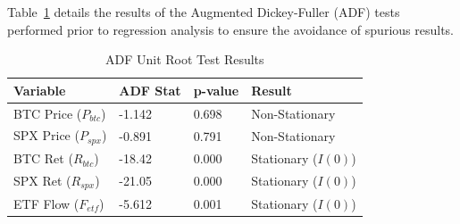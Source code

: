 \documentclass[10pt, conference, compsocconf]{IEEEtran}
\begin{document}
Table~\ref{tab:stationarity} details the results of the Augmented Dickey-Fuller (ADF) tests performed prior to regression analysis to ensure the avoidance of spurious results.

\begin{table}[htbp]
\caption{ADF Unit Root Test Results}
\centering
\small
\begin{tabularx}{\linewidth}{lXXX}
\toprule
\textbf{Variable} & \textbf{ADF Stat} & \textbf{p-value} & \textbf{Result} \\
\midrule
BTC Price ($P_{btc}$) & -1.142 & 0.698 & Non-Stationary \\
SPX Price ($P_{spx}$) & -0.891 & 0.791 & Non-Stationary \\
BTC Ret ($R_{btc}$) & -18.42 & 0.000 & Stationary ($I(0)$) \\
SPX Ret ($R_{spx}$) & -21.05 & 0.000 & Stationary ($I(0)$) \\
ETF Flow ($F_{etf}$) & -5.612 & 0.001 & Stationary ($I(0)$) \\
\bottomrule
\end{tabularx}
\label{tab:stationarity}
\end{table}


\end{document}
